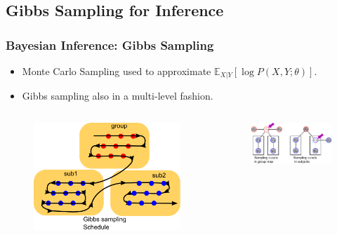 \documentclass[sansserif, 10pt]{beamer}
\begin{document}
\subsection{Gibbs Sampling for Inference}
\begin{frame}
  \frametitle{Bayesian Inference: Gibbs Sampling}
  \begin{block}{}
    \begin{itemize}
      \item Monte Carlo Sampling used to approximate $\mathbb{E}_{X|Y} [\log
        P(X,Y;\theta)]$.
        \item Gibbs sampling also in a multi-level fashion.
    \end{itemize}
    \end{block}

  \begin{columns}
    \begin{column}{0.5\textwidth}
      \begin{figure}
        \includegraphics[width=1\textwidth]{sfig/hiergibbs2}
        \end{figure}
      \end{column}
    \begin{column}{0.5\textwidth}
      \begin{figure}
        \includegraphics[width=1\textwidth]{sfig/voxelgibbs}
        \end{figure}
    \end{column}
\end{columns}



\end{frame}
\end{document}
